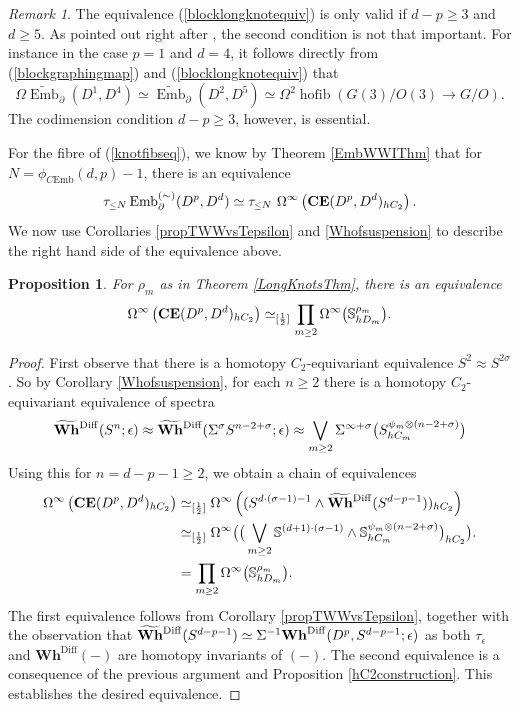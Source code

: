 \documentclass[a4paper, oneside]{amsart}
\newcommand{\diff}{\mathrm{Diff}}
\newcommand{\bemb}{\widetilde{\operatorname{Emb}}}
\newcommand{\hofib}{\operatorname{hofib}}
\newcommand{\cemb}{C\mathrm{Emb}}
\newcommand{\1}{\mathds{1}}
\newtheorem{prop}[thm]{Proposition}
\theoremstyle{remark}
\newtheorem{rem}[thm]{Remark}%
\theoremstyle{definition}
\newcommand{\geqs}{\scaleobj{0.85}{\geq}}
\newcommand{\leqs}{\scaleobj{0.85}{\leq}}
\newcommand{\s}{\mathbb{S}}
\newcommand{\bWhsp}{\widetilde{\mathbf{Wh}}{\vphantom{\mathrm{Wh}}}^{\diff}}
\newcommand{\pemb}{\operatorname{Emb}^{(\sim)}}
\newcommand{\CEsp}{\mathbf{CE}}
\newcommand{\Whsp}{\mathbf{Wh}^{\diff}}
\numberwithin{equation}{section}
\begin{document}
\begin{rem}\label{p1d4caserem}
    The equivalence (\ref{blocklongknotequiv}) is only valid if $d-p\geq 3$ and $d\geq 5$. As pointed out right after \cite[Thm. 2.2.1]{GoodwillieKleinWeiss}, the second condition is not that important. For instance in the case $p=1$ and $d=4$, it follows directly from (\ref{blockgraphingmap}) and (\ref{blocklongknotequiv}) that
    $$
\Omega\bemb_\partial(D^1,D^4)\simeq \bemb_\partial(D^2,D^5)\simeq \Omega^2\hofib(G(3)/O(3)\to G/O).
    $$
    The codimension condition $d-p\geq 3$, however, is essential.
\end{rem}

For the fibre of (\ref{knotfibseq}), we know by Theorem \ref{EmbWWIThm} that for $N=\phi_{\cemb}(d,p)-1$, there is an equivalence
$$
\tau_{\leqs N}\pemb_\partial(D^p,D^d) \simeq \tau_{\leqs N}\ \Omega^\infty\left(\CEsp(D^p,D^d)_{hC_2}\right).
$$
We now use Corollaries \ref{propTWWvsTepsilon} and \ref{Whofsuspension} to describe the right hand side of the equivalence above.

\begin{prop}
    For $\rho_m$ as in Theorem \ref{LongKnotsThm}, there is an equivalence
    $$
\Omega^\infty\left(\CEsp(D^p,D^d)_{hC_2}\right)\simeq_{[\frac{1}{2}]} \prod_{m\geqs 2} \Omega^{\infty}\big(\s^{\rho_m}_{hD_m}\big).
    $$
\end{prop}

\begin{proof}
First observe that there is a homotopy $C_2$-equivariant equivalence $S^2\approx S^{2\sigma}$. So by Corollary \ref{Whofsuspension}, for each $n\geq 2$ there is a homotopy $C_2$-equivariant equivalence of spectra
$$
\bWhsp(S^n;\epsilon)\approx \bWhsp(\Sigma^{\sigma}S^{n-2+\sigma};\epsilon)\approx \bigvee_{m\geq 2}\Sigma^{\infty+\sigma}\big(S^{\psi_m\otimes (n-2+\sigma)}_{hC_m}\big)
$$
Using this for $n=d-p-1\geq 2$, we obtain a chain of equivalences
\begin{align*}
    \Omega^\infty\left(\CEsp(D^p,D^d)_{hC_2}\right)&\simeq_{[\frac12]} \Omega^\infty\left((S^{d\cdot(\sigma-1)-1}\wedge\bWhsp(S^{d-p-1}))_{hC_2}\right)\\
    &\simeq_{[\frac12]}\Omega^\infty\big(\big(\bigvee_{m\geq 2}\s^{(d+1)\cdot(\sigma-1)}\wedge \s^{\psi_m\otimes(n-2+\sigma)}_{hC_m}\big)_{hC_2}\big).\\
    &=\prod_{m\geqs 2} \Omega^{\infty}\big(\s^{\rho_m}_{hD_m}\big).
\end{align*}
The first equivalence follows from Corollary \ref{propTWWvsTepsilon}, together with the observation that $\bWhsp(S^{d-p-1})\simeq \Sigma^{-1}\Whsp(D^p,S^{d-p-1};\epsilon)$ as both $\tau_\epsilon$ and $\Whsp(-)$ are homotopy invariants of $(-)$. The second equivalence is a consequence of the previous argument and Proposition \ref{hC2construction}. This establishes the desired equivalence.
\end{proof}
\end{document}
